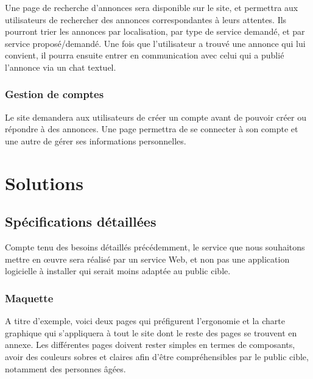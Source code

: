 \documentclass[a4paper,11pt]{article}
\begin{document}
Une page de recherche d’annonces sera disponible sur le site, et permettra aux utilisateurs de
rechercher des annonces correspondantes à leurs attentes. Ils pourront trier les annonces par
localisation, par type de service demandé, et par service proposé/demandé. Une fois que l’utilisateur
a trouvé une annonce qui lui convient, il pourra ensuite entrer en communication avec celui qui a
publié l’annonce via un chat textuel.\\

\subsubsection{Gestion de comptes}

Le site demandera aux utilisateurs de créer un compte avant de pouvoir créer ou répondre à des
annonces. Une page permettra de se connecter à son compte et une autre de gérer ses informations
personnelles.\\

\newpage
\section{Solutions}

\subsection{Spécifications détaillées}

Compte tenu des besoins détaillés précédemment, le service que nous souhaitons mettre en œuvre
sera réalisé par un service Web, et non pas une application logicielle à installer qui serait moins
adaptée au public cible.\\

\subsubsection{Maquette}

A titre d’exemple, voici deux pages qui préfigurent l’ergonomie et la charte graphique qui s’appliquera
à tout le site dont le reste des pages se trouvent en annexe. Les différentes pages doivent rester
simples en termes de composants, avoir des couleurs sobres et claires afin d’être compréhensibles
par le public cible, notamment des personnes âgées.\\
\end{document}
